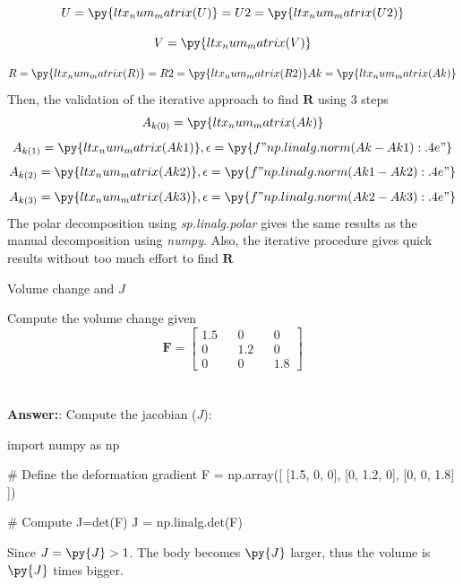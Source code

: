 $$
    U = \py{ltx_num_matrix(U)} = U2 = \py{ltx_num_matrix(U2)}
$$

$$
    V = \py{ltx_num_matrix(V)}
$$

$$
    R = \py{ltx_num_matrix(R)} = R2 = \py{ltx_num_matrix(R2)} Ak = \py{ltx_num_matrix(Ak)}
$$
Then, the validation of the iterative approach to find $\mathbf{R}$ using 3 steps
$$
    A_{k(0)} = \py{ltx_num_matrix(Ak)}
$$
$$
    A_{k(1)} = \py{ltx_num_matrix(Ak1)}, \epsilon =\py{f"{np.linalg.norm(Ak - Ak1):.4e}"}
$$
$$
    A_{k(2)} = \py{ltx_num_matrix(Ak2)}, \epsilon = \py{f"{np.linalg.norm(Ak1 - Ak2):.4e}"}
$$
$$
    A_{k(3)} = \py{ltx_num_matrix(Ak3)}, \epsilon = \py{f"{np.linalg.norm(Ak2 - Ak3):.4e}"}
$$
The polar decomposition using \textit{sp.linalg.polar} gives the same results as the manual decomposition using \textit{numpy}. Also, the iterative procedure gives quick results without too much effort to find $\mathbf{R}$

\begin{problem}
    Volume change and $J$
\end{problem}
Compute the volume change given
$$
    \mathbf{F} = \begin{bmatrix}
        1.5 && 0 && 0 \\
        0 && 1.2 && 0 \\
        0 && 0 && 1.8
    \end{bmatrix}
$$
\\\\ \textbf{Answer:}: Compute the jacobian ($J$):
\begin{pyblock} 
import numpy as np

# Define the deformation gradient
F = np.array([
    [1.5, 0, 0],
    [0, 1.2, 0],
    [0, 0, 1.8]
])

# Compute J=det(F)
J = np.linalg.det(F)
\end{pyblock}
Since $J = \py{J} > 1$. The body becomes $\py{J}$ larger, thus the volume is $\py{J}$ times bigger.